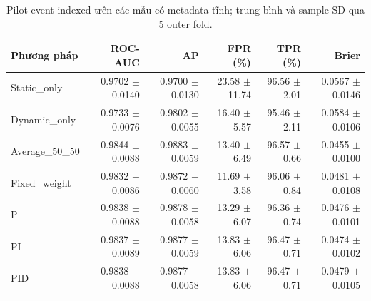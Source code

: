 \begin{table}[htbp]
\centering
\small
\caption{Pilot event-indexed trên các mẫu có metadata tĩnh; trung bình và sample SD qua 5 outer fold.}
\begin{tabular}{lrrrrr}
\toprule
Phương pháp & ROC-AUC & AP & FPR (\%) & TPR (\%) & Brier \\
\midrule
Static\_only & 0.9702 $\pm$ 0.0140 & 0.9700 $\pm$ 0.0130 & 23.58 $\pm$ 11.74 & 96.56 $\pm$ 2.01 & 0.0567 $\pm$ 0.0146 \\
Dynamic\_only & 0.9733 $\pm$ 0.0076 & 0.9802 $\pm$ 0.0055 & 16.40 $\pm$ 5.57 & 95.46 $\pm$ 2.11 & 0.0584 $\pm$ 0.0106 \\
Average\_50\_50 & 0.9844 $\pm$ 0.0088 & 0.9883 $\pm$ 0.0059 & 13.40 $\pm$ 6.49 & 96.57 $\pm$ 0.66 & 0.0455 $\pm$ 0.0100 \\
Fixed\_weight & 0.9832 $\pm$ 0.0086 & 0.9872 $\pm$ 0.0060 & 11.69 $\pm$ 3.58 & 96.06 $\pm$ 0.84 & 0.0481 $\pm$ 0.0108 \\
P & 0.9838 $\pm$ 0.0088 & 0.9878 $\pm$ 0.0058 & 13.29 $\pm$ 6.07 & 96.36 $\pm$ 0.74 & 0.0476 $\pm$ 0.0101 \\
PI & 0.9837 $\pm$ 0.0089 & 0.9877 $\pm$ 0.0059 & 13.83 $\pm$ 6.06 & 96.47 $\pm$ 0.71 & 0.0474 $\pm$ 0.0102 \\
PID & 0.9838 $\pm$ 0.0088 & 0.9877 $\pm$ 0.0058 & 13.83 $\pm$ 6.06 & 96.47 $\pm$ 0.71 & 0.0479 $\pm$ 0.0105 \\
\bottomrule
\end{tabular}
\end{table}
